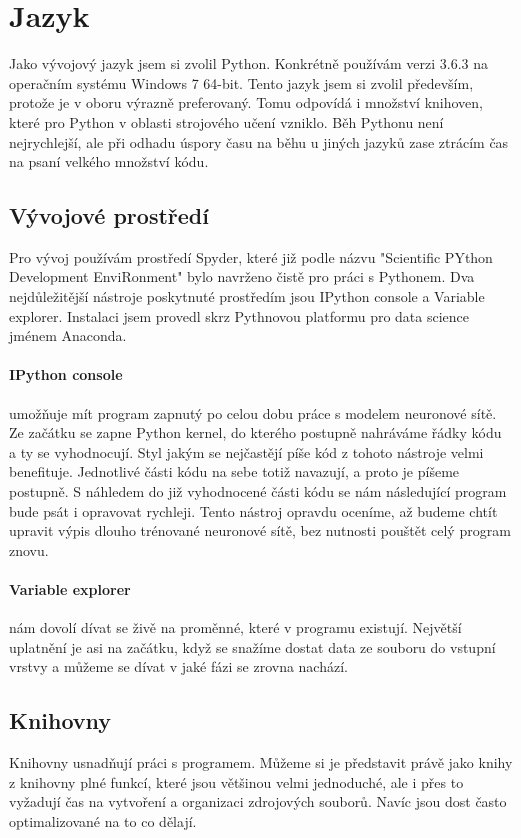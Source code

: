 \documentclass[12pt,a4paper]{report}
\begin{document}
	\section{Jazyk}
	Jako vývojový jazyk jsem si zvolil Python. Konkrétně používám verzi 3.6.3 na operačním systému Windows 7 64-bit. Tento jazyk jsem si zvolil především, protože je v oboru výrazně preferovaný. Tomu odpovídá i množství knihoven, které pro Python v oblasti strojového učení vzniklo. Běh Pythonu není nejrychlejší, ale při odhadu úspory času na běhu u jiných jazyků zase ztrácím čas na psaní velkého množství kódu.
		\subsection{Vývojové prostředí}
		Pro vývoj používám prostředí Spyder, které již podle názvu "Scientific PYthon Development EnviRonment" bylo navrženo čistě pro práci s Pythonem. Dva nejdůležitější nástroje poskytnuté prostředím jsou IPython console a Variable explorer. Instalaci jsem provedl skrz Pythnovou platformu pro data science jménem Anaconda.
		\paragraph{IPython console}
		umožňuje mít program zapnutý po celou dobu práce s modelem neuronové sítě. Ze začátku se zapne Python kernel, do kterého postupně nahráváme řádky kódu a ty se vyhodnocují. Styl jakým se nejčastějí píše kód z tohoto nástroje velmi benefituje. Jednotlivé části kódu na sebe totiž navazují, a proto je píšeme postupně. S náhledem do již vyhodnocené části kódu se nám následující program bude psát i opravovat rychleji. Tento nástroj opravdu oceníme, až budeme chtít upravit výpis dlouho trénované neuronové sítě, bez nutnosti pouštět celý program znovu.
		\paragraph{Variable explorer}
		nám dovolí dívat se živě na proměnné, které v programu existují. Největší uplatnění je asi na začátku, když se snažíme dostat data ze souboru do vstupní vrstvy a můžeme se dívat v jaké fázi se zrovna nachází.
		\subsection{Knihovny}
		Knihovny usnadňují práci s programem. Můžeme si je představit právě jako knihy z knihovny plné funkcí, které jsou většinou velmi jednoduché, ale i přes to vyžadují čas na vytvoření a organizaci zdrojových souborů. Navíc jsou dost často optimalizované na to co dělají.
\end{document}
